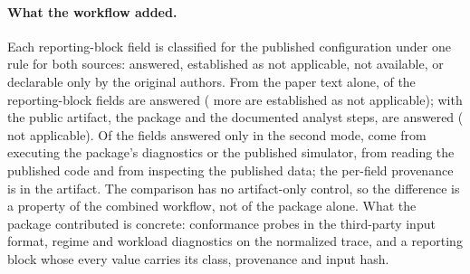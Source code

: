 \paragraph{What the workflow added.}
Each reporting-block field is classified for the published configuration under
one rule for both sources: answered, established as not applicable, not
available, or declarable only by the original authors. From the paper text
alone, \CSfieldsPaperOnly{} of the \CSfieldsTotal{} reporting-block fields are
answered (\CSfieldsPaperOnlyNotApplicable{} more are established as not
applicable); with the public artifact, the package and the documented analyst
steps, \CSfieldsWithArtifacts{} are answered
(\CSfieldsWithArtifactsNotApplicable{} not applicable). Of the
\CSfieldsAnsweredOnlyWithArtifacts{} fields answered only in the second mode,
\CSaddedByExecution{} come from executing the package's diagnostics or the
published simulator, \CSaddedByCodeInspection{} from reading the published code
and \CSaddedByDataInspection{} from inspecting the published data; the per-field
provenance is in the artifact. The comparison has no artifact-only control, so
the difference is a property of the combined workflow, not of the package alone.
What the package contributed is concrete: conformance probes in the third-party
input format, regime and workload diagnostics on the normalized trace, and a
reporting block whose every value carries its class, provenance and input hash.
